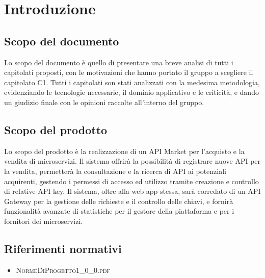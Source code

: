 \newpage
\section{Introduzione}
\subsection{Scopo del documento}
Lo scopo del documento è quello di presentare una breve analisi di tutti i capitolati proposti, con le motivazioni che hanno portato il gruppo a scegliere il capitolato C1. Tutti i capitolati son stati analizzati con la medesima metodologia,  evidenziando le tecnologie necessarie, il dominio applicativo e le criticità, e dando un giudizio finale con le opinioni raccolte all'interno del gruppo.

\subsection{Scopo del prodotto}
Lo scopo del prodotto è la realizzazione di un API Market per l'acquisto e la vendita di microservizi. Il sistema offrirà la possibilità di registrare nuove API per la vendita, permetterà la consultazione e la ricerca di API ai potenziali acquirenti, gestendo i permessi di accesso ed utilizzo tramite creazione e controllo di relative API key. Il sistema, oltre alla web app stessa, sarà corredato di un API Gateway per la gestione delle richieste e il controllo delle chiavi, e fornirà funzionalità avanzate di statistiche per il gestore della piattaforma e per i fornitori dei microservizi.

\subsection{Riferimenti normativi}
\begin{itemize}
	\item \textsc{NormeDiProgetto1\_0\_0.pdf}
\end{itemize}

